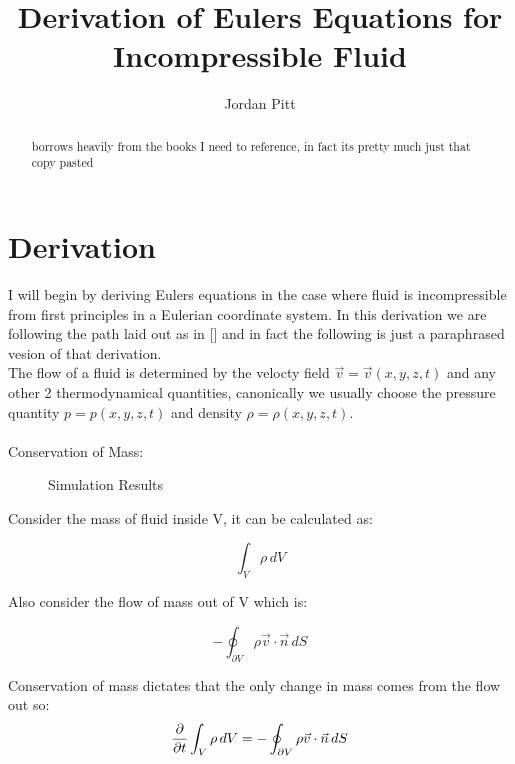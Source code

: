 \documentclass{article}
\begin{document}
\title{Derivation of Eulers Equations for Incompressible Fluid}
\author{Jordan Pitt}

\maketitle

\begin{abstract}
borrows heavily from the books I need to reference, in fact its pretty much just that copy pasted
\end{abstract}

\section{Derivation}

I will begin by deriving Eulers equations in the case where fluid is incompressible from first principles in a Eulerian coordinate system. In this derivation we are following the path laid out as in [] and in fact the following is just a paraphrased vesion of that derivation. \\


 \noindent The flow of a fluid is determined by the velocty field $\vec{v} = \vec{v}(x,y,z,t)$ and any other 2 thermodynamical quantities, canonically we usually choose the pressure quantity $p = p(x,y,z,t)$ and density $\rho = \rho(x,y,z,t)$. \\


\\

\noindent Conservation of Mass: \\
\begin{figure}
    \centering
    \caption{Simulation Results}
    \label{simulationfigure}
\end{figure}

\noindent Consider the mass of fluid inside V, it can be calculated as:

\begin{equation}
    \label{mass in V}
    \int_V \rho \,dV
\end{equation}

\noindent Also consider the flow of mass out of V which is:

\begin{equation}
    \label{Flow out of V}
     - \oint_{\partial V} \rho  \vec{v} \cdot \vec{n} \,dS
\end{equation}

\noindent Conservation of mass dictates that the only change in mass comes from the flow out so:
\begin{equation}
    \label{Conservation of Mass}
    {\partial \over \partial t}\int_V \rho \,dV = - \oint_{\partial V} \rho  \vec{v} \cdot \vec{n} \,dS
\end{equation}
\end{document}
